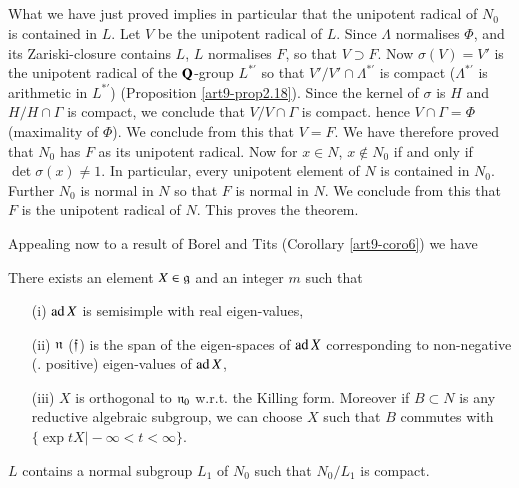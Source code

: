 \setcounter{subsection}{44}
\subsection{}\label{art9-subsec2.45}
What we have just proved implies in particular that the unipotent radical of $N_0$ is contained in $L$. Let $V$ be the unipotent radical of $L$. Since $\Lambda$ normalises $\Phi$, and its  Zariski-closure contains $L$, $L$ normalises $F$, so that $V \supset F$. Now $\sigma (V) = V'$ is the unipotent radical of the $\mathbf{Q}$-group $L^{\ast'}$ so that $V'/V' \cap \Lambda^{\ast'}$ is compact ($\Lambda^{\ast'}$ is arithmetic in $L^{\ast'}$) (Proposition \ref{art9-prop2.18}). Since the kernel of $\sigma$ is $H$ and $H/H \cap \Gamma$ is compact, we conclude that $V/V \cap \Gamma$ is compact. hence $V \cap \Gamma = \Phi$ (maximality of $\Phi$). We conclude from this that $V = F$. We have therefore proved that $N_0$ has $F$ as its unipotent radical. Now for $x \in N$, $x \not\in N_0$ if and only if $\det \sigma (x) \neq 1$. In particular, every unipotent element of $N$ is contained in $N_0$. Further $N_0$ is normal in $N$ so that $F$ is normal in $N$. We conclude from this that $F$ is the unipotent radical of $N$. This proves the theorem.

Appealing now to a result of Borel and Tits (Corollary \ref{art9-coro6}) we have 

\setcounter{definition}{45}
\begin{corollary}\label{art9-subsec2.46}
There exists an element $X \in \mathfrak{g}$ and an integer $m$ such that 
\begin{itemize}
\item[(i)] $\operatorname{ad} X$ is semisimple with real eigen-values,

\item[(ii)] $\mathfrak{n}$ (\resp $\mathfrak{f}$) is the span of the eigen-spaces of $\operatorname{ad} X$ corresponding to non-negative (\resp. positive) eigen-values of $\operatorname{ad} X$,

\item[(iii)] $X$ is orthogonal to $\mathfrak{n}_0$ w.r.t. the Killing form. Moreover if $B \subset N$ is any reductive algebraic subgroup, we can choose $X$ such that $B$ commutes with $\{\exp t X \big| - \infty < t < \infty \}$.
\end{itemize}
\end{corollary}

\begin{corollary}\label{art9-coro2.47}
$L$ contains a normal subgroup $L_1$ of $N_0$ such that $N_0/ L_1$ is compact.
\end{corollary}

